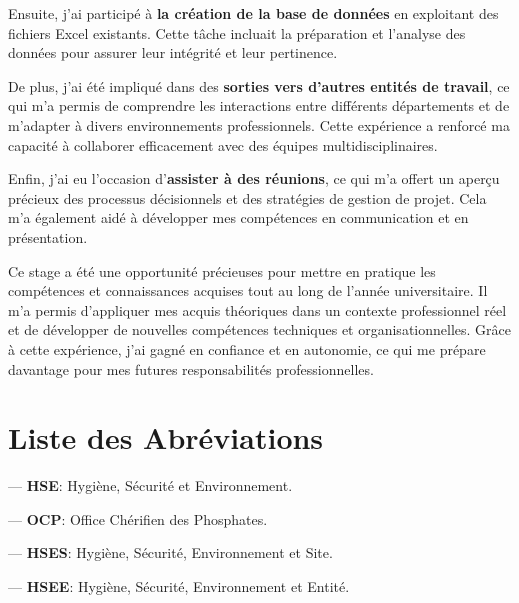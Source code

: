 \documentclass[a4paper,12pt]{report}
\begin{document}
Ensuite, j'ai participé à \textbf{la création de la base de données} en exploitant des fichiers Excel existants. Cette tâche incluait la préparation et l'analyse des données pour assurer leur intégrité et leur pertinence.

De plus, j'ai été impliqué dans des \textbf{sorties vers d'autres entités de travail}, ce qui m'a permis de comprendre les interactions entre différents départements et de m'adapter à divers environnements professionnels. Cette expérience a renforcé ma capacité à collaborer efficacement avec des équipes multidisciplinaires.

Enfin, j'ai eu l'occasion d'\textbf{assister à des réunions}, ce qui m'a offert un aperçu précieux des processus décisionnels et des stratégies de gestion de projet. Cela m'a également aidé à développer mes compétences en communication et en présentation.

Ce stage a été une opportunité précieuses pour mettre en pratique les compétences et connaissances acquises tout au long de l'année universitaire. Il m'a permis d'appliquer mes acquis théoriques dans un contexte professionnel réel et de développer de nouvelles compétences techniques et organisationnelles. Grâce à cette expérience, j'ai gagné en confiance et en autonomie, ce qui me prépare davantage pour mes futures responsabilités professionnelles.

\newpage


\tableofcontents
\newpage



\listoffigures



\newpage

\chapter*{Liste des Abréviations}
     — \textbf{HSE}: Hygiène, Sécurité et Environnement.
     
     — \textbf{OCP}: Office Chérifien des Phosphates.
     
     — \textbf{HSES}: Hygiène, Sécurité, Environnement et Site.
     
     — \textbf{HSEE}: Hygiène, Sécurité, Environnement et Entité.
     
\end{document}
